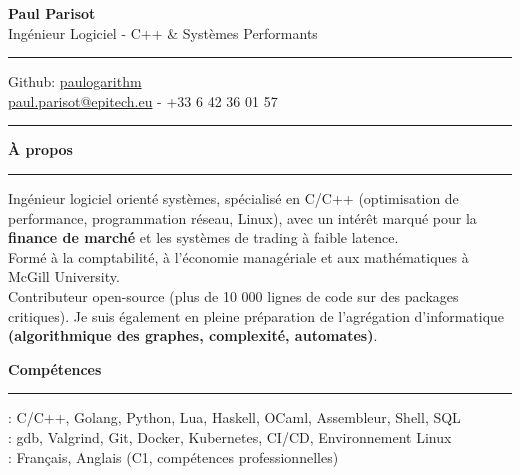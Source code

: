 \documentclass[9pt]{extarticle}
\begin{document}
\begin{center}
	{\huge\bfseries Paul Parisot}
	\\[4pt]
	{\Large Ingénieur Logiciel - C++ \& Systèmes Performants}
	\\
\end{center}

\par\vspace{-5pt}
\rule{\linewidth}{0.4pt}
\par\vspace{-5pt}

\begin{center}
	Github: \href{https://github.com/paulogarithm}{paulogarithm}
	\\
	\href{mailto:paul.parisot@epitech.eu}{paul.parisot@epitech.eu} - +33 6 42 36 01 57
	\\
\end{center}

\par\vspace{-10pt}
\rule{\linewidth}{0.4pt}
\par\vspace{7pt}

{\large\bfseries À propos}
\par\vspace{-8pt}
\rule{\linewidth}{0.4pt}
\par\vspace{5pt}

Ingénieur logiciel orienté systèmes, spécialisé en C/C++ (optimisation de performance, programmation réseau, Linux), avec un intérêt marqué pour la {\bfseries finance de marché} et les systèmes de trading à faible latence.
\\
Formé à la comptabilité, à l'économie managériale et aux mathématiques à McGill University.
\\
Contributeur open-source (plus de 10 000 lignes de code sur des packages critiques). Je suis également en pleine préparation de l'agrégation d'informatique {\bfseries (algorithmique des graphes, complexité, automates)}.
\par\vspace{5pt}

{\large\bfseries Compétences}
\par\vspace{-8pt}
\rule{\linewidth}{0.4pt}
\par\vspace{5pt}

\hspace*{5pt}{\bfseries Maîtrise}: C/C++, Golang, Python, Lua, Haskell, OCaml, Assembleur, Shell, SQL
\\
\hspace*{5pt}{\bfseries Outils}: gdb, Valgrind, Git, Docker, Kubernetes, CI/CD, Environnement Linux
\\
\hspace*{5pt}{\bfseries Langues}: Français, Anglais (C1, compétences professionnelles)
\end{document}
